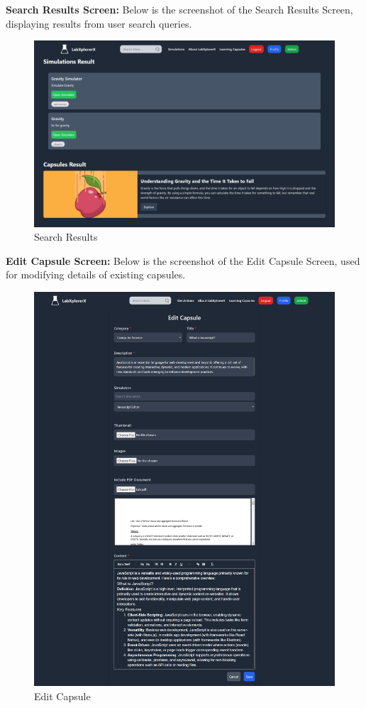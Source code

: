 \textbf{Search Results Screen:} Below is the screenshot of the Search Results Screen, displaying results from user search queries.
\begin{figure}[H]
    \centering
    \includegraphics[width = 16cm]{Diagrams/output/search_results.png}
    \caption{Search Results}
\end{figure}
\newpage

\textbf{Edit Capsule Screen:} Below is the screenshot of the Edit Capsule Screen, used for modifying details of existing capsules.
\begin{figure}[H]
    \centering
    \includegraphics[width = 16cm]{Diagrams/output/edit_capsule.png}
    \caption{Edit Capsule}
\end{figure}

